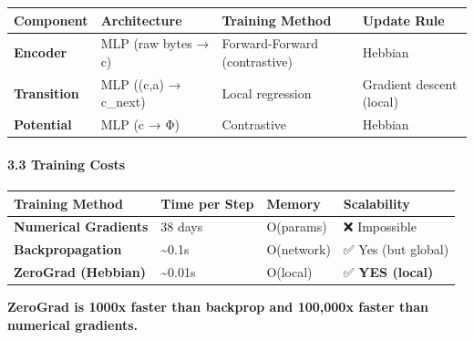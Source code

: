 \documentclass[
  11pt,
  a4paper,
]{article}
\begin{document}
\begin{longtable}[]{@{}
  >{\raggedright\arraybackslash}p{}
  >{\raggedright\arraybackslash}p{}
  >{\raggedright\arraybackslash}p{}
  >{\raggedright\arraybackslash}p{}@{}}
\toprule\noalign{}
\begin{minipage}[b]{\linewidth}\raggedright
Component
\end{minipage} & \begin{minipage}[b]{\linewidth}\raggedright
Architecture
\end{minipage} & \begin{minipage}[b]{\linewidth}\raggedright
Training Method
\end{minipage} & \begin{minipage}[b]{\linewidth}\raggedright
Update Rule
\end{minipage} \\
\midrule\noalign{}
\endhead
\bottomrule\noalign{}
\endlastfoot
\textbf{Encoder} & MLP (raw bytes → c) & Forward-Forward (contrastive) &
Hebbian \\
\textbf{Transition} & MLP ((c,a) → c\_next) & Local regression &
Gradient descent (local) \\
\textbf{Potential} & MLP (c → Φ) & Contrastive & Hebbian \\
\end{longtable}

\paragraph{3.3 Training Costs}\label{training-costs}

\begin{longtable}[]{@{}llll@{}}
\toprule\noalign{}
Training Method & Time per Step & Memory & Scalability \\
\midrule\noalign{}
\endhead
\bottomrule\noalign{}
\endlastfoot
\textbf{Numerical Gradients} & 38 days & O(params) & ❌ Impossible \\
\textbf{Backpropagation} & \textasciitilde0.1s & O(network) & ✅ Yes
(but global) \\
\textbf{ZeroGrad (Hebbian)} & \textasciitilde0.01s & O(local) & ✅
\textbf{YES (local)} \\
\end{longtable}

\textbf{ZeroGrad is 1000x faster than backprop and 100,000x faster than
numerical gradients.}
\end{document}
